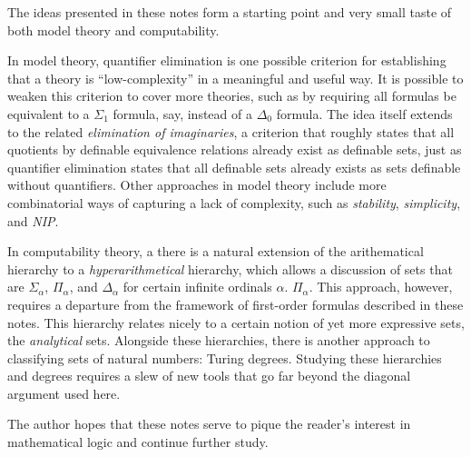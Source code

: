 \documentclass{article}
\theoremstyle{plain}
\theoremstyle{definition}
\newcommand{\defterm}{\emph}
\begin{document}
The ideas presented in these notes form a starting point and very
small taste of both model theory and computability.

In model theory, quantifier elimination is one possible criterion for
establishing that a theory is ``low-complexity'' in a meaningful and
useful way. It is possible to weaken this criterion to cover more
theories, such as by requiring all formulas be equivalent to a
$\Sigma_1$ formula, say, instead of a $\Delta_0$ formula. The idea
itself extends to the related \defterm{elimination of imaginaries}, a
criterion that roughly states that all quotients by definable
equivalence relations already exist as definable sets, just as
quantifier elimination states that all definable sets already exists
as sets definable without quantifiers. Other approaches in model
theory include more combinatorial ways of capturing a lack of
complexity, such as \defterm{stability}, \defterm{simplicity}, and
\defterm{NIP}.

In computability theory, a there is a natural extension of the
arithematical hierarchy to a \defterm{hyperarithmetical} hierarchy,
which allows a discussion of sets that are $\Sigma_\alpha$,
$\Pi_\alpha$, and $\Delta_\alpha$ for certain infinite ordinals
$\alpha$.  $\Pi_\alpha$. This approach, however, requires a departure
from the framework of first-order formulas described in these
notes. This hierarchy relates nicely to a certain notion of yet more
expressive sets, the \defterm{analytical} sets. Alongside these
hierarchies, there is another approach to classifying sets of natural
numbers: Turing degrees. Studying these hierarchies and degrees
requires a slew of new tools that go far beyond the diagonal argument
used here.

The author hopes that these notes serve to pique the reader's interest
in mathematical logic and continue further study.

\printbibliography
\end{document}

